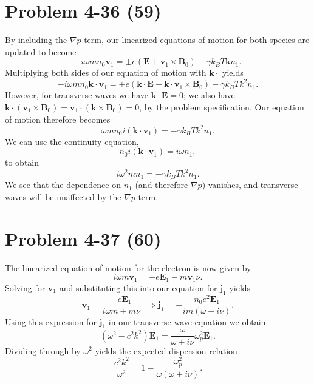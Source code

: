 \section*{Problem 4-36 (59)}
\label{sec:4-36}
By including the \(\nabla p \) term, our linearized equations of motion for both species are updated to become
\begin{equation*}
	-i\omega m n_0 \bm{v}_1 = \pm e \left(\bm{E} + \bm{v}_1 \times \bm{B}_0 \right) - \gamma k_BT\bm{k}n_1.
\end{equation*}
Multiplying both sides of our equation of motion with \(\bm{k} \cdot  \) yields
\begin{equation*}
-i\omega m n_0 \bm{k} \cdot\bm{v}_1 = \pm e \left(\bm{k} \cdot\bm{E} + \bm{k} \cdot\bm{v}_1 \times \bm{B}_0 \right) - \gamma k_BTk^2n_1.
\end{equation*}
However, for transverse waves we have \(\bm{k} \cdot \bm{E} = 0 \); we also have \(\bm{k} \cdot \left(\bm{v}_1 \times \bm{B}_0\right) = \bm{v}_1 \cdot \left(\bm{k} \times \bm{B}_0\right) = 0 \), by the problem specification. Our equation of motion therefore becomes 
\begin{equation*}
	\omega m n_0 i \left(\bm{k} \cdot \bm{v}_1 \right) = -\gamma k_BTk^2n_1.
\end{equation*}
We can use the continuity equation,
\begin{equation*}
	n_0 i \left(\bm{k} \cdot \bm{v}_1 \right) = i\omega n_1,
\end{equation*}
to obtain
\begin{equation*}
	i\omega^2m n_1 = -\gamma k_BTk^2n_1.
\end{equation*}
We see that the dependence on \(n_1\) (and therefore \(\nabla p \)) vanishes, and transverse waves will be unaffected by the \(\nabla p \) term.

\section*{Problem 4-37 (60)}
\label{sec:4-37}
The linearized equation of motion for the electron is now given by
\begin{equation*}
	i\omega m \bm{v}_1 = -e\bm{E}_1 - m \bm{v}_1\nu.
\end{equation*}
Solving for \(\bm{v}_1 \) and substituting this into our equation for \(\bm{j}_1 \) yields 
\begin{equation*}
	\bm{v}_1 = \dfrac{-e\bm{E}_1}{i\omega m + m\nu} \implies \bm{j}_1 = -\dfrac{n_0e^2\bm{E}_1}{im(\omega+i\nu)}.
\end{equation*}
Using this expression for \(\bm{j}_1 \) in our transverse wave equation we obtain
\begin{equation*}
	\left(\omega^2 - c^2k^2 \right)\bm{E}_1 = \dfrac{\omega}{\omega + i\nu}\omega_p^2\bm{E}_1.
\end{equation*}
Dividing through by \(\omega^2 \) yields the expected dispersion relation
\begin{equation*}
	\dfrac{c^2k^2}{\omega^2} = 1 - \dfrac{\omega^2_p}{\omega(\omega + i\nu)}.
\end{equation*}

